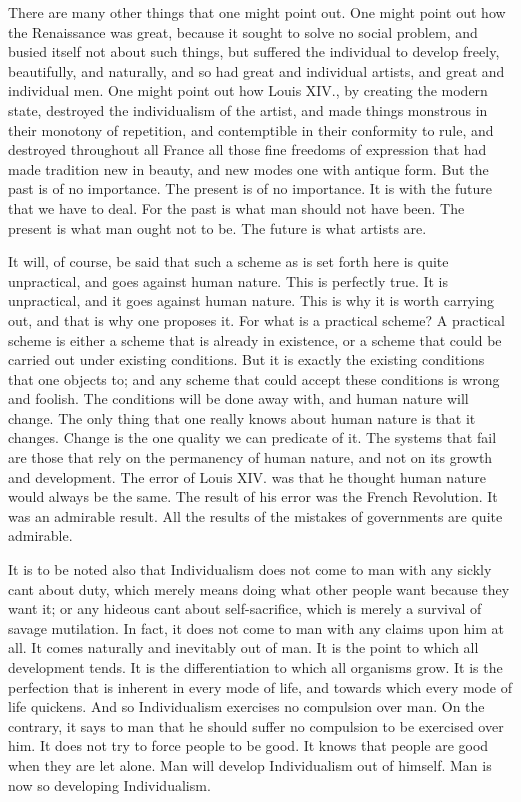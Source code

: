 There are many other things that one might point out. One might point out how the Renaissance was great, because it sought to solve no social problem, and busied itself not about such things, but suffered the individual to develop freely, beautifully, and naturally, and so had great and individual artists, and great and individual men. One might point out how Louis XIV., by creating the modern state, destroyed the individualism of the artist, and made things monstrous in their monotony of repetition, and contemptible in their conformity to rule, and destroyed throughout all France all those fine freedoms of expression that had made tradition new in beauty, and new modes one with antique form. But the past is of no importance. The present is of no importance. It is with the future that we have to deal. For the past is what man should not have been. The present is what man ought not to be. The future is what artists are.\par

It will, of course, be said that such a scheme as is set forth here is quite unpractical, and goes against human nature. This is perfectly true. It is unpractical, and it goes against human nature. This is why it is worth carrying out, and that is why one proposes it. For what is a practical scheme? A practical scheme is either a scheme that is already in existence, or a scheme that could be carried out under existing conditions. But it is exactly the existing conditions that one objects to; and any scheme that could accept these conditions is wrong and foolish. The conditions will be done away with, and human nature will change. The only thing that one really knows about human nature is that it changes. Change is the one quality we can predicate of it. The systems that fail are those that rely on the permanency of human nature, and not on its growth and development. The error of Louis XIV. was that he thought human nature would always be the same. The result of his error was the French Revolution. It was an admirable result. All the results of the mistakes of governments are quite admirable.\par

It is to be noted also that Individualism does not come to man with any sickly cant about duty, which merely means doing what other people want because they want it; or any hideous cant about self-sacrifice, which is merely a survival of savage mutilation. In fact, it does not come to man with any claims upon him at all. It comes naturally and inevitably out of man. It is the point to which all development tends. It is the differentiation to which all organisms grow. It is the perfection that is inherent in every mode of life, and towards which every mode of life quickens. And so Individualism exercises no compulsion over man. On the contrary, it says to man that he should suffer no compulsion to be exercised over him. It does not try to force people to be good. It knows that people are good when they are let alone. Man will develop Individualism out of himself. Man is now so developing Individualism.\par

